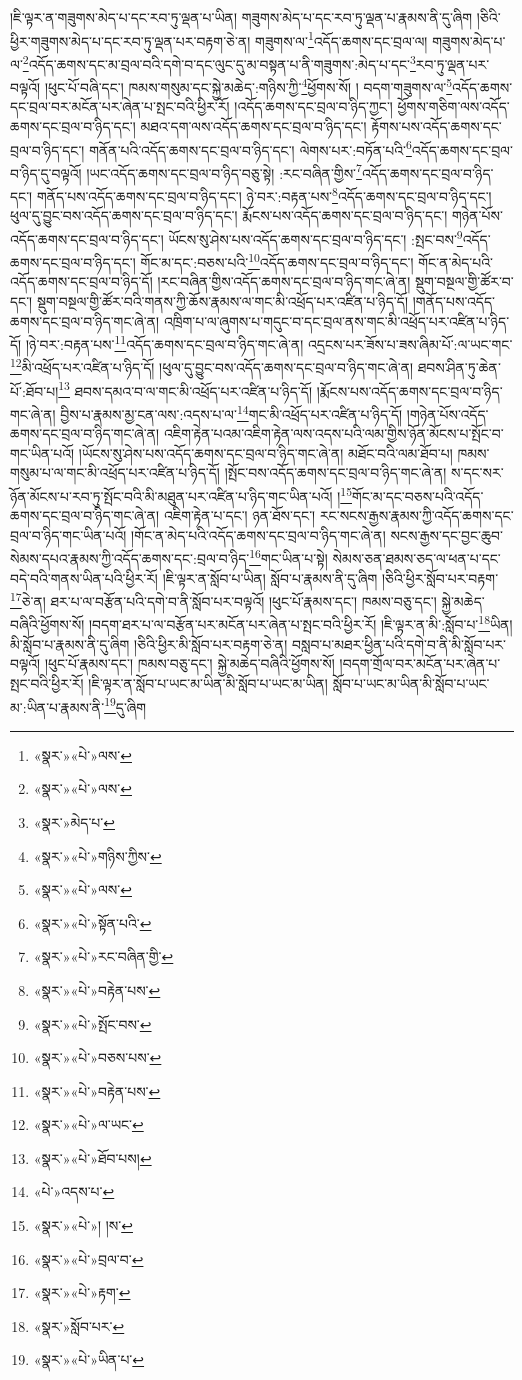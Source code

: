 །ཇི་ལྟར་ན་གཟུགས་མེད་པ་དང་རབ་ཏུ་ལྡན་པ་ཡིན། གཟུགས་མེད་པ་དང་རབ་ཏུ་ལྡན་པ་རྣམས་ནི་དུ་ཞིག །ཅིའི་ཕྱིར་གཟུགས་མེད་པ་དང་རབ་ཏུ་ལྡན་པར་བརྟག་ཅེ་ན། གཟུགས་ལ་\footnote{«སྣར་»«པེ་»ལས་}འདོད་ཆགས་དང་བྲལ་ལ། གཟུགས་མེད་པ་ལ་\footnote{«སྣར་»«པེ་»ལས་}འདོད་ཆགས་དང་མ་བྲལ་བའི་དགེ་བ་དང་ལུང་དུ་མ་བསྟན་པ་ནི་གཟུགས་:མེད་པ་དང་\footnote{«སྣར་»མེད་པ་}རབ་ཏུ་ལྡན་པར་བལྟའོ། །ཕུང་པོ་བཞི་དང་། ཁམས་གསུམ་དང་སྐྱེ་མཆེད་:གཉིས་ཀྱི་\footnote{«སྣར་»«པེ་»གཉིས་ཀྱིས་}ཕྱོགས་སོ། །
བདག་གཟུགས་ལ་\footnote{«སྣར་»«པེ་»ལས་}འདོད་ཆགས་དང་བྲལ་བར་མངོན་པར་ཞེན་པ་སྤང་བའི་ཕྱིར་རོ། །འདོད་ཆགས་དང་བྲལ་བ་ཉིད་ཀྱང་། ཕྱོགས་གཅིག་ལས་འདོད་ཆགས་དང་བྲལ་བ་ཉིད་དང་། མཐའ་དག་ལས་འདོད་ཆགས་དང་བྲལ་བ་ཉིད་དང་། རྟོགས་པས་འདོད་ཆགས་དང་བྲལ་བ་ཉིད་དང་། གནོན་པའི་འདོད་ཆགས་དང་བྲལ་བ་ཉིད་དང་། ལེགས་པར་:བཏོན་པའི་\footnote{«སྣར་»«པེ་»སྟོན་པའི་}འདོད་ཆགས་དང་བྲལ་བ་ཉིད་དུ་བལྟའོ། །ཡང་འདོད་ཆགས་དང་བྲལ་བ་ཉིད་བཅུ་སྟེ། :རང་བཞིན་གྱིས་\footnote{«སྣར་»«པེ་»རང་བཞིན་གྱི་}འདོད་ཆགས་དང་བྲལ་བ་ཉིད་དང་། གནོད་པས་འདོད་ཆགས་དང་བྲལ་བ་ཉིད་དང་། ཉེ་བར་:བརྟན་པས་\footnote{«སྣར་»«པེ་»བརྟེན་པས་}འདོད་ཆགས་དང་བྲལ་བ་ཉིད་དང་། ཕུལ་དུ་བྱུང་བས་འདོད་ཆགས་དང་བྲལ་བ་ཉིད་དང་། རྨོངས་པས་འདོད་ཆགས་དང་བྲལ་བ་ཉིད་དང་། གཉེན་པོས་འདོད་ཆགས་དང་བྲལ་བ་ཉིད་དང་། ཡོངས་སུ་ཤེས་པས་འདོད་ཆགས་དང་བྲལ་བ་ཉིད་དང་། :སྤང་བས་\footnote{«སྣར་»«པེ་»སྤོང་བས་}འདོད་ཆགས་དང་བྲལ་བ་ཉིད་དང་། གོང་མ་དང་:བཅས་པའི་\footnote{«སྣར་»«པེ་»བཅས་པས་}འདོད་ཆགས་དང་བྲལ་བ་ཉིད་དང་། གོང་ན་མེད་པའི་འདོད་ཆགས་དང་བྲལ་བ་ཉིད་དོ། །རང་བཞིན་གྱིས་འདོད་ཆགས་དང་བྲལ་བ་ཉིད་གང་ཞེ་ན། སྡུག་བསྔལ་གྱི་ཚོར་བ་དང་། སྡུག་བསྔལ་གྱི་ཚོར་བའི་གནས་ཀྱི་ཆོས་རྣམས་ལ་གང་མི་འཕྲོད་པར་འཛིན་པ་ཉིད་དོ། །གནོད་པས་འདོད་ཆགས་དང་བྲལ་བ་ཉིད་གང་ཞེ་ན། འཁྲིག་པ་ལ་ཞུགས་པ་གདུང་བ་དང་བྲལ་ནས་གང་མི་འཕྲོད་པར་འཛིན་པ་ཉིད་དོ། །ཉེ་བར་:བརྟན་པས་\footnote{«སྣར་»«པེ་»བརྟེན་པས་}འདོད་ཆགས་དང་བྲལ་བ་ཉིད་གང་ཞེ་ན། འདྲངས་པར་ཟོས་པ་ཟས་ཞིམ་པོ་:ལ་ཡང་གང་\footnote{«སྣར་»«པེ་»ལ་ཡང་}མི་འཕྲོད་པར་འཛིན་པ་ཉིད་དོ། །ཕུལ་དུ་བྱུང་བས་འདོད་ཆགས་དང་བྲལ་བ་ཉིད་གང་ཞེ་ན། ཐབས་ཤིན་ཏུ་ཆེན་པོ་:ཐོབ་པ།\footnote{«སྣར་»«པེ་»ཐོབ་པས།} ཐབས་དམའ་བ་ལ་གང་མི་འཕྲོད་པར་འཛིན་པ་ཉིད་དོ། །རྨོངས་པས་འདོད་ཆགས་དང་བྲལ་བ་ཉིད་གང་ཞེ་ན། བྱིས་པ་རྣམས་མྱ་ངན་ལས་:འདས་པ་ལ་\footnote{«པེ་»འདས་པ་}གང་མི་འཕྲོད་པར་འཛིན་པ་ཉིད་དོ། །གཉེན་པོས་འདོད་ཆགས་དང་བྲལ་བ་ཉིད་གང་ཞེ་ན། འཇིག་རྟེན་པའམ་འཇིག་རྟེན་ལས་འདས་པའི་ལམ་གྱིས་ཉོན་མོངས་པ་སྤོང་བ་གང་ཡིན་པའོ། །ཡོངས་སུ་ཤེས་པས་འདོད་ཆགས་དང་བྲལ་བ་ཉིད་གང་ཞེ་ན། མཐོང་བའི་ལམ་ཐོབ་པ། ཁམས་གསུམ་པ་ལ་གང་མི་འཕྲོད་པར་འཛིན་པ་ཉིད་དོ། །སྤོང་བས་འདོད་ཆགས་དང་བྲལ་བ་ཉིད་གང་ཞེ་ན། ས་དང་སར་ཉོན་མོངས་པ་རབ་ཏུ་སྤོང་བའི་མི་མཐུན་པར་འཛིན་པ་ཉིད་གང་ཡིན་པའོ། །\footnote{«སྣར་»«པེ་»། །ས་}གོང་མ་དང་བཅས་པའི་འདོད་ཆགས་དང་བྲལ་བ་ཉིད་གང་ཞེ་ན། འཇིག་རྟེན་པ་དང་། ཉན་ཐོས་དང་། རང་སངས་རྒྱས་རྣམས་ཀྱི་འདོད་ཆགས་དང་བྲལ་བ་ཉིད་གང་ཡིན་པའོ། །གོང་ན་མེད་པའི་འདོད་ཆགས་དང་བྲལ་བ་ཉིད་གང་ཞེ་ན། སངས་རྒྱས་དང་བྱང་ཆུབ་སེམས་དཔའ་རྣམས་ཀྱི་འདོད་ཆགས་དང་:བྲལ་བ་ཉིད་\footnote{«སྣར་»«པེ་»བྲལ་བ་}གང་ཡིན་པ་སྟེ། སེམས་ཅན་ཐམས་ཅད་ལ་ཕན་པ་དང་བདེ་བའི་གནས་ཡིན་པའི་ཕྱིར་རོ། །ཇི་ལྟར་ན་སློབ་པ་ཡིན། སློབ་པ་རྣམས་ནི་དུ་ཞིག །ཅིའི་ཕྱིར་སློབ་པར་བརྟག་\footnote{«སྣར་»«པེ་»རྟག་}ཅེ་ན། ཐར་པ་ལ་བརྩོན་པའི་དགེ་བ་ནི་སློབ་པར་བལྟའོ། །ཕུང་པོ་རྣམས་དང་། ཁམས་བཅུ་དང་། སྐྱེ་མཆེད་བཞིའི་ཕྱོགས་སོ། །བདག་ཐར་པ་ལ་བརྩོན་པར་མངོན་པར་ཞེན་པ་སྤང་བའི་ཕྱིར་རོ། །ཇི་ལྟར་ན་མི་:སློབ་པ་\footnote{«སྣར་»སློབ་པར་}ཡིན། མི་སློབ་པ་རྣམས་ནི་དུ་ཞིག །ཅིའི་ཕྱིར་མི་སློབ་པར་བརྟག་ཅེ་ན། བསླབ་པ་མཐར་ཕྱིན་པའི་དགེ་བ་ནི་མི་སློབ་པར་བལྟའོ། །ཕུང་པོ་རྣམས་དང་། ཁམས་བཅུ་དང་། སྐྱེ་མཆེད་བཞིའི་ཕྱོགས་སོ། །བདག་གྲོལ་བར་མངོན་པར་ཞེན་པ་སྤང་བའི་ཕྱིར་རོ། །ཇི་ལྟར་ན་སློབ་པ་ཡང་མ་ཡིན་མི་སློབ་པ་ཡང་མ་ཡིན། སློབ་པ་ཡང་མ་ཡིན་མི་སློབ་པ་ཡང་མ་:ཡིན་པ་རྣམས་ནི་\footnote{«སྣར་»«པེ་»ཡིན་པ་}དུ་ཞིག 